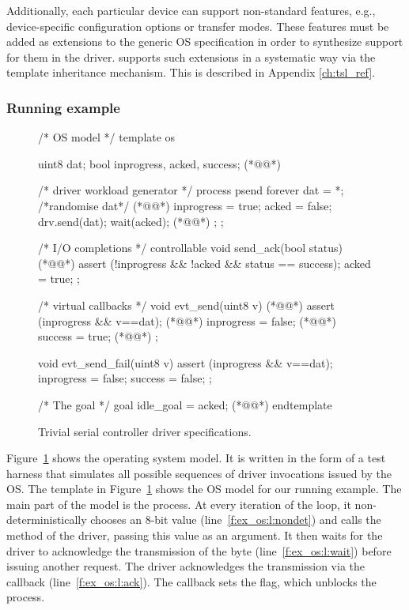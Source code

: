 Additionally, each particular device can support non-standard features, e.g., device-specific configuration options or transfer modes.  These features must be added as extensions to the generic OS specification in order to synthesize support for them in the driver.  \tsl supports such extensions in a systematic way via the template inheritance mechanism.  This is described in Appendix \ref{ch:tsl_ref}.

\subsubsection{Running example}

\begin{figure}
\lstset{firstnumber=last}
\begin{tsllisting}[name=ex]
/* OS model */
template os 

    uint8 dat;
    bool inprogress, acked, success; (*@\label{f:ex_os:l:vars}@*)

    /* driver workload generator */
    process psend {
        forever {
            dat = *; /*randomise dat*/ (*@\label{f:ex_os:l:nondet}@*)
            inprogress = true;
            acked = false;
            drv.send(dat);
            wait(acked); (*@\label{f:ex_os:l:wait}@*)
        };
    };

    /* I/O completions */
    controllable void send_ack(bool status) { (*@\label{f:ex_os:l:ack}@*)
        assert (!inprogress && !acked && status == success);
        acked = true;
    };

    /* virtual callbacks */
    void evt_send(uint8 v) { (*@\label{f:ex_os:l:send_cb}@*)
        assert (inprogress && v==dat); (*@\label{f:ex_os:l:assert}@*)
        inprogress = false; (*@\label{f:ex_os:l:inprogress}@*)
        success = true; (*@\label{f:ex_os:l:success}@*)
    };

    void evt_send_fail(uint8 v) {
        assert (inprogress && v==dat);
        inprogress = false;
        success = false;
    };

    /* The goal */
    goal idle_goal = acked; (*@\label{f:ex_os:l:goal}@*)
endtemplate
\end{tsllisting}
\caption{Trivial serial controller driver specifications.}
\label{f:ex_os}
\end{figure}

Figure~\ref{f:ex_os} shows the operating system model. It is written in the form of a test harness that simulates all possible sequences of driver invocations issued by the OS.  The  template in Figure~\ref{f:ex_os} shows the OS model for our running example.  The main part of the model is the  process.  At every iteration of the loop, it non-deterministically chooses an 8-bit value (line~\ref{f:ex_os:l:nondet}) and calls the  method of the driver, passing this value as an argument.  It then waits for the driver to acknowledge the transmission of the byte (line~\ref{f:ex_os:l:wait}) before issuing another request.  The driver acknowledges the transmission via the  callback (line~\ref{f:ex_os:l:ack}).  The callback sets the  flag, which unblocks the  process.

